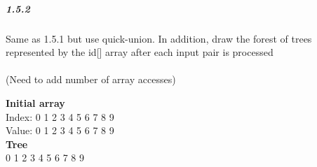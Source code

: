 \documentclass{article}
\begin{document}
\subparagraph{\large 1.5.2} Same as 1.5.1 but use quick-union. In addition, draw the forest of trees represented by the id[] array after each input pair is processed\\\\

(Need to add number of array accesses)

\textbf{Initial array}\\
Index: \hspace{4pt}0 \hspace{4pt}1 \hspace{4pt}2 \hspace{4pt}3 \hspace{4pt}4 \hspace{4pt}5 \hspace{4pt}6 \hspace{4pt}7 \hspace{4pt}8 \hspace{4pt}9\\
Value: \hspace{4pt}0 \hspace{4pt}1 \hspace{4pt}2 \hspace{4pt}3 \hspace{4pt}4 \hspace{4pt}5 \hspace{4pt}6 \hspace{4pt}7 \hspace{4pt}8 \hspace{4pt}9\\
\textbf{Tree}\\
0 \hspace{4pt}1 \hspace{4pt}2 \hspace{4pt}3 \hspace{4pt}4 \hspace{4pt}5 \hspace{4pt}6 \hspace{4pt}7 \hspace{4pt}8 \hspace{4pt}9
\end{document}
